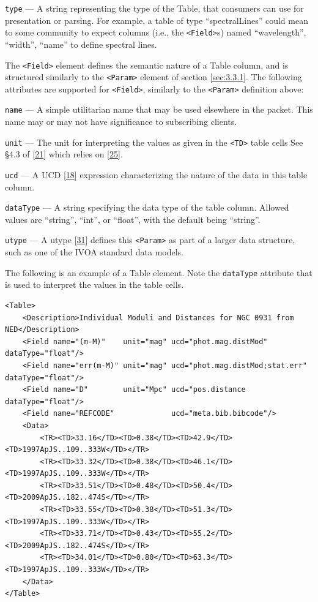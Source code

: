\documentclass[11pt,a4paper]{ivoa}
\begin{document}
 {\tt type}\label{sec:3.3.3.2} --- A string representing the type of the Table, that consumers can use for presentation or parsing. For example, a table of type ``spectralLines'' could mean to some community to expect columns (i.e., the {\tt <Field>}s) named ``wavelength'', ``width'', ``name'' to define spectral lines. 

The {\tt <Field>} element defines the semantic nature of a Table column, and is structured similarly to the {\tt <Param>} element of section \ref{sec:3.3.1}. The following attributes are supported for {\tt <Field>}, similarly to the {\tt <Param>} definition above: 

 {\tt name}\label{sec:3.3.3.3} --- A simple utilitarian name that may be used elsewhere in the packet. This name may or may not have significance to subscribing clients. 

 {\tt unit}\label{sec:3.3.3.4} --- The unit for interpreting the values as given in the {\tt <TD>} table cells See \S4.3 of [\hyperref[bib21]{21}]
which relies on [\hyperref[bib25]{25}]. 

 {\tt ucd}\label{sec:3.3.3.5} --- A UCD [\hyperref[bib18]{18}]
expression characterizing the nature of the data in this table column. 

 {\tt dataType}\label{sec:3.3.3.6} --- A string specifying the data type of the table column. Allowed values are ``string'', ``int'', or ``float'', with the default being ``string''.
 
 {\tt utype}\label{sec:3.3.3.7} --- A utype [\hyperref[bib31]{31}] defines this {\tt <Param>} as part of a larger data structure, such as one of the IVOA standard data models. 
 
 The following is an example of a Table element. Note the {\tt dataType} attribute that is used to interpret the values in the table cells. 
{\footnotesize
\begin{verbatim}
<Table>
    <Description>Individual Moduli and Distances for NGC 0931 from NED</Description>
    <Field name="(m-M)"    unit="mag" ucd="phot.mag.distMod" dataType="float"/>
    <Field name="err(m-M)" unit="mag" ucd="phot.mag.distMod;stat.err" dataType="float"/>
    <Field name="D"        unit="Mpc" ucd="pos.distance dataType="float"/>
    <Field name="REFCODE"             ucd="meta.bib.bibcode"/>
    <Data>
        <TR><TD>33.16</TD><TD>0.38</TD><TD>42.9</TD><TD>1997ApJS..109..333W</TD></TR>
        <TR><TD>33.32</TD><TD>0.38</TD><TD>46.1</TD><TD>1997ApJS..109..333W</TD></TR>
        <TR><TD>33.51</TD><TD>0.48</TD><TD>50.4</TD><TD>2009ApJS..182..474S</TD></TR>
        <TR><TD>33.55</TD><TD>0.38</TD><TD>51.3</TD><TD>1997ApJS..109..333W</TD></TR>
        <TR><TD>33.71</TD><TD>0.43</TD><TD>55.2</TD><TD>2009ApJS..182..474S</TD></TR>
        <TR><TD>34.01</TD><TD>0.80</TD><TD>63.3</TD><TD>1997ApJS..109..333W</TD></TR>
    </Data>
</Table> 
\end{verbatim}}
\end{document}
